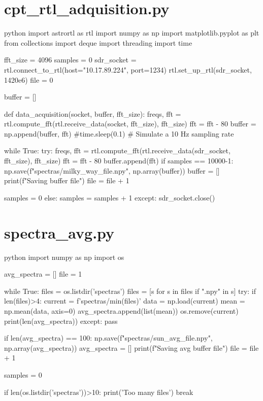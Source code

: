 \section*{cpt\_rtl\_adquisition.py}

\begin{sourcecode}[]{python}{}
import astrortl as rtl
import numpy as np
import matplotlib.pyplot as plt
from collections import deque
import threading
import time

fft_size = 4096
samples = 0
sdr_socket = rtl.connect_to_rtl(host="10.17.89.224", port=1234)
rtl.set_up_rtl(sdr_socket, 1420e6)
file = 0

buffer = []

def data_acquisition(socket, buffer, fft_size):
    freqs, fft = rtl.compute_fft(rtl.receive_data(socket, fft_size), fft_size)
    fft = fft - 80
    buffer = np.append(buffer, fft)
        #time.sleep(0.1)  # Simulate a 10 Hz sampling rate

while True:
    try:
        freqs, fft = rtl.compute_fft(rtl.receive_data(sdr_socket, fft_size), fft_size)
        fft = fft - 80
        buffer.append(fft)
        if samples == 10000-1:
            np.save(f"spectras/milky_way_{file}.npy", np.array(buffer))
            buffer = []
            print(f"Saving buffer {file}")
            file = file + 1

            samples = 0
        else:
            samples = samples + 1
    except:
        sdr_socket.close()
\end{sourcecode}

\section*{spectra\_avg.py}

\begin{sourcecode}[]{python}{}
    import numpy as np
    import os

    avg_spectra = []
    file = 1
    
    while True:
        files = os.listdir('spectras')
        files = [s for s in files if ".npy" in s]
        try:
            if len(files)>4:
                current = f'spectras/{min(files)}'
                data = np.load(current)
                mean = np.mean(data, axis=0)
                avg_spectra.append(list(mean))
                os.remove(current)
                print(len(avg_spectra))
        except: pass
            
        if len(avg_spectra) == 100:
            np.save(f"spectras/sun_avg_{file}.npy", np.array(avg_spectra))
            avg_spectra = []
            print(f"Saving avg buffer {file}")
            file = file + 1
    
            samples = 0
            
        if len(os.listdir('spectras'))>10:
            print('Too many files')
            break
            

\end{sourcecode}

